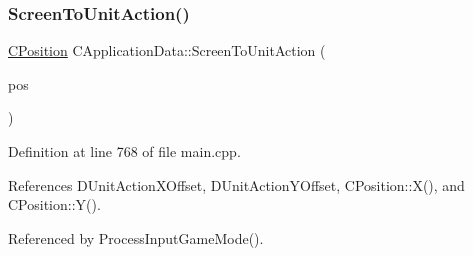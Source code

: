 \subsubsection{\texorpdfstring{Screen\+To\+Unit\+Action()}{ScreenToUnitAction()}}
{\footnotesize\ttfamily \hyperlink{classCPosition}{C\+Position} C\+Application\+Data\+::\+Screen\+To\+Unit\+Action (\begin{DoxyParamCaption}\item[{const \hyperlink{classCPosition}{C\+Position} \&}]{pos }\end{DoxyParamCaption})\hspace{0.3cm}{\ttfamily [protected]}}



Definition at line 768 of file main.\+cpp.



References D\+Unit\+Action\+X\+Offset, D\+Unit\+Action\+Y\+Offset, C\+Position\+::\+X(), and C\+Position\+::\+Y().



Referenced by Process\+Input\+Game\+Mode().



